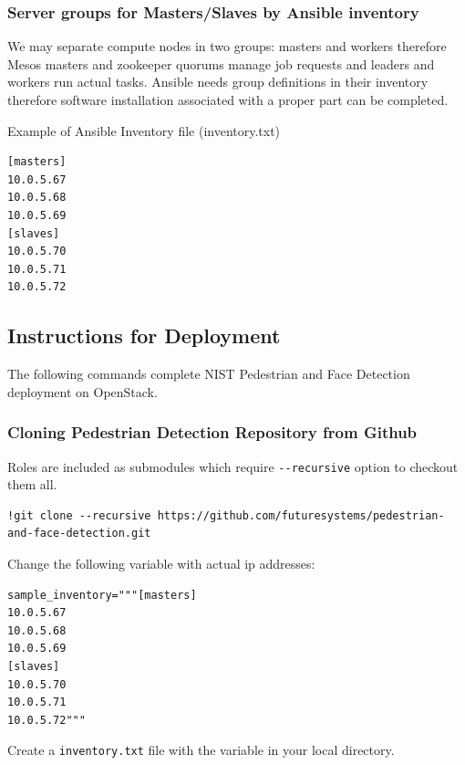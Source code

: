 \subsubsection{Server groups for Masters/Slaves by Ansible
inventory}\label{server-groups-for-mastersslaves-by-ansible-inventory}

We may separate compute nodes in two groups: masters and workers
therefore Mesos masters and zookeeper quorums manage job requests and
leaders and workers run actual tasks. Ansible needs group definitions in
their inventory therefore software installation associated with a proper
part can be completed.

Example of Ansible Inventory file (inventory.txt)

\begin{lstlisting}
[masters]
10.0.5.67
10.0.5.68
10.0.5.69
[slaves]
10.0.5.70
10.0.5.71
10.0.5.72
\end{lstlisting}

\subsection{Instructions for
Deployment}\label{instructions-for-deployment}

The following commands complete NIST Pedestrian and Face Detection
deployment on OpenStack.

\subsubsection{Cloning Pedestrian Detection Repository from
Github}\label{cloning-pedestrian-detection-repository-from-github}

Roles are included as submodules which require \texttt{-\/-recursive}
option to checkout them all.

\begin{lstlisting}
!git clone --recursive https://github.com/futuresystems/pedestrian-and-face-detection.git
\end{lstlisting}

Change the following variable with actual ip addresses:

\begin{lstlisting}
sample_inventory="""[masters]
10.0.5.67
10.0.5.68
10.0.5.69
[slaves]
10.0.5.70
10.0.5.71
10.0.5.72"""
\end{lstlisting}

Create a \texttt{inventory.txt} file with the variable in your local
directory.

